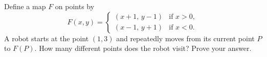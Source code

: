 Define a map $F$ on points by
\[F(x,y)=\begin{cases}(x+1,\,y-1)&\text{if }x>0,\\(x-1,\,y+1)&\text{if }x<0.\end{cases}\]
A robot starts at the point $(1,3)$ and repeatedly moves from its current point $P$ to $F(P)$. How many different points does the robot visit? Prove your answer.
